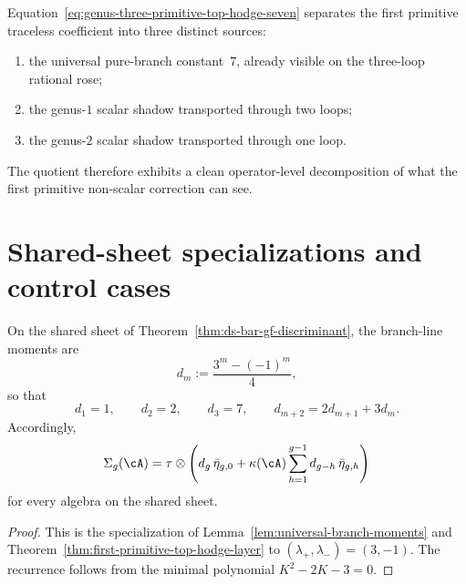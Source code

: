 \begin{remark}
\label{rem:what-genus-three-remembers}
Equation~\eqref{eq:genus-three-primitive-top-hodge-seven} separates the
first primitive traceless coefficient into three distinct sources:
\begin{enumerate}[label=\textup{(\roman*)}]
\item the universal pure-branch constant~\(7\), already visible on the
 three-loop rational rose;
\item the genus-\(1\) scalar shadow transported through two loops;
\item the genus-\(2\) scalar shadow transported through one loop.
\end{enumerate}
The quotient therefore exhibits a clean operator-level decomposition of
what the first primitive non-scalar correction can see.
\end{remark}

\section{Shared-sheet specializations and control cases}
\label{sec:blr-shared-sheet-specializations}

\begin{corollary}
\label{cor:shared-sheet-universal-coefficients}
On the shared sheet of
Theorem~\ref{thm:ds-bar-gf-discriminant}, the branch-line moments are
\begin{equation}
\label{eq:shared-sheet-dm}
 d_m:=\frac{3^m-(-1)^m}{4},
\end{equation}
so that
\[
 d_1=1,
 \qquad
 d_2=2,
 \qquad
 d_3=7,
 \qquad
 d_{m+2}=2d_{m+1}+3d_m.
\]
Accordingly,
\begin{equation}
\label{eq:shared-sheet-general-primitive-layer}
\Sigma_g(\cA)
=
\tau\otimes
\left(
 d_g\,\bar\eta_{g,0}
 +
 \kappa(\cA)
 \sum_{h=1}^{g-1}d_{g-h}\,\bar\eta_{g,h}
 \right)
\end{equation}
for every algebra on the shared sheet.
\end{corollary}

\begin{proof}
This is the specialization of
Lemma~\ref{lem:universal-branch-moments} and
Theorem~\ref{thm:first-primitive-top-hodge-layer} to
\((\lambda_+,\lambda_-)=(3,-1)\). The recurrence follows from the
minimal polynomial \(K^2-2K-3=0\).
\end{proof}

